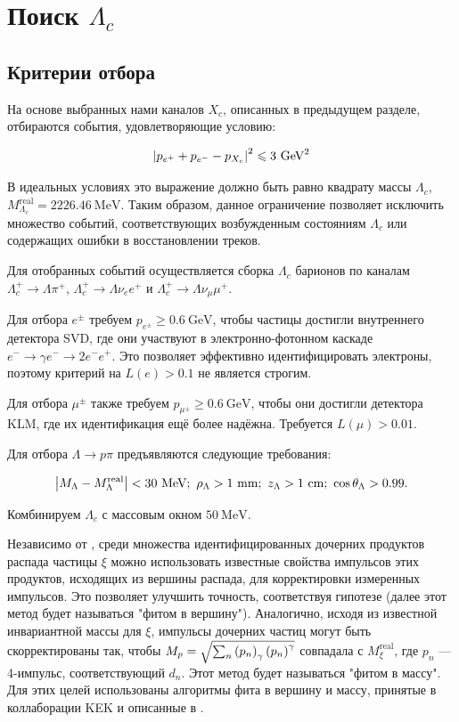 \section{Поиск $\Lambda_c$}
\label{Lamc:search}
\subsection{Критерии отбора}
На основе выбранных нами каналов $X_c$, описанных в предыдущем разделе, 
отбираются события, удовлетворяющие условию:

\begin{equation}
    \abs{p_{e^+} + p_{e^-} - p_{X_c}}^2 \leqslant 3 \ \text{GeV}^2
\end{equation}

В идеальных условиях это выражение должно быть равно квадрату массы $\Lambda_c$, 
$M^{\text{real}}_{\Lambda_c} = 2226.46 \ \text{MeV}$. Таким образом, данное ограничение позволяет исключить множество событий, соответствующих возбужденным состояниям $\Lambda_c$ или содержащих ошибки в восстановлении треков.

Для отобранных событий осуществляется сборка $\Lambda_c$ барионов по каналам 
$\Lambda_c^+ \to \Lambda \pi^+$, $\Lambda_c^+ \to \Lambda \nu_e e^+$ и $\Lambda_c^+ \to \Lambda \nu_\mu \mu^+$.

\newdot Для отбора $e^\pm$ требуем $p_{e^\pm} \geq 0.6 \ \text{GeV}$, чтобы частицы достигли внутреннего детектора SVD, где они участвуют в электронно-фотонном каскаде $e^- \to \gamma e^- \to 2e^- e^+$. Это позволяет эффективно идентифицировать электроны, поэтому критерий на $L(e) > 0.1$ не является строгим.

\newdot Для отбора $\mu^\pm$ также требуем $p_{\mu^\pm} \geq 0.6 \ \text{GeV}$, чтобы они достигли детектора KLM, где их идентификация ещё более надёжна. Требуется $L(\mu) > 0.01$.

\newdot Для отбора $\Lambda \to p \pi$ предъявляются следующие требования:

$$
\abs{ M_{\Lambda} - M^{\text{real}}_{\Lambda} } < 30 \ \text{MeV}; 
\ \rho_{\Lambda} > 1 \ \text{mm}; \ z_{\Lambda} > 1 \ \text{cm}; 
\ \cos \theta_{\Lambda} > 0.99.
$$

\newdot Комбинируем $\Lambda_c$ с массовым окном $50 \ \text{MeV}$.

\newdot Независимо от \cite{BelleDetector2002}, среди множества идентифицированных дочерних продуктов распада частицы $\xi$ можно использовать известные свойства импульсов этих продуктов, исходящих из вершины распада, для корректировки измеренных импульсов. Это позволяет улучшить точность, соответствуя гипотезе (далее этот метод будет называться "фитом в вершину"). Аналогично, исходя из известной инвариантной массы для $\xi$, импульсы дочерних частиц могут быть скорректированы так, чтобы $M_p = \sqrt{\sum_n \left( p_n \right)_\gamma \left( p_n \right)^\gamma}$ совпадала с $M^{\text{real}}_{\xi}$, где $p_n$ — 4-импульс, соответствующий $d_n$. Этот метод будет называться "фитом в массу". Для этих целей использованы алгоритмы фита в вершину и массу, принятые в коллаборации KEK и описанные в \cite{Krohn2021}.

